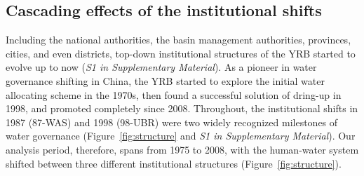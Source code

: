 \subsection{Cascading effects of the institutional shifts}
\label{effects}
Including the national authorities, the basin management authorities, provinces, cities, and even districts, top-down institutional structures of the YRB started to evolve up to now (\textit{S1 in Supplementary Material}).
As a pioneer in water governance shifting in China, the YRB started to explore the initial water allocating scheme in the 1970s, then found a successful solution of dring-up in 1998, and promoted completely since 2008.
Throughout, the institutional shifts in 1987 (87-WAS) and 1998 (98-UBR) were two widely recognized milestones of water governance (Figure~\ref{fig:structure} and \textit{S1 in Supplementary Material}).
Our analysis period, therefore, spans from 1975 to 2008, with the human-water system shifted between three different institutional structures (Figure~\ref{fig:structure}).

